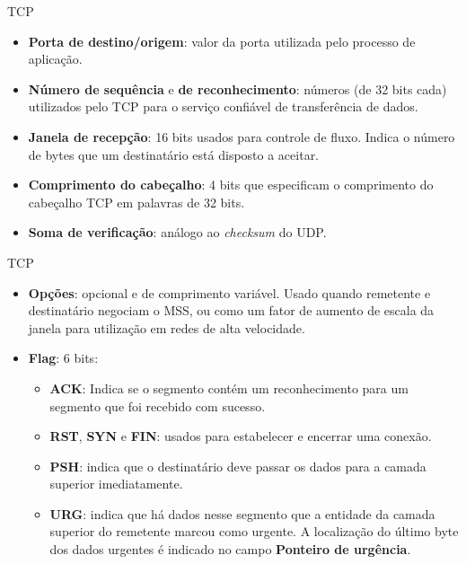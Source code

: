 \documentclass{libs/ufc_format}
\begin{document}
\begin{frame}{TCP}
    \begin{itemize}
        \justifying
        \item \textbf{Porta de destino/origem}: valor da porta utilizada pelo processo de aplicação.
        \item \textbf{Número de sequência} e \textbf{de reconhecimento}: números (de 32 bits cada) utilizados pelo TCP  para o serviço confiável de transferência de dados.
        \item \textbf{Janela de recepção}: 16 bits usados para controle de fluxo. Indica o número de bytes que um destinatário está disposto a aceitar.
        \item \textbf{Comprimento do cabeçalho}: 4 bits que especificam o comprimento do cabeçalho TCP em palavras de 32 bits.
        \item \textbf{Soma de verificação}: análogo ao \textit{checksum} do UDP.
    \end{itemize}
\end{frame}

\begin{frame}{TCP}
    \begin{itemize}
        \justifying
        \item \textbf{Opções}: opcional e de comprimento variável. Usado quando remetente e destinatário negociam o MSS, ou como um fator de aumento de escala da janela para utilização em redes de alta velocidade.
        \item \textbf{Flag}: 6 bits:
            \begin{itemize}
                \justifying
                \item \textbf{ACK}: Indica se o segmento contém um reconhecimento para um segmento que foi recebido com sucesso.
                \item \textbf{RST}, \textbf{SYN} e \textbf{FIN}: usados para estabelecer e encerrar uma conexão.
                \item \textbf{PSH}: indica que o destinatário deve passar os dados para a camada superior imediatamente.
                \item \textbf{URG}: indica que há dados nesse segmento que a entidade da camada superior do remetente marcou como urgente. A localização do último byte dos dados urgentes é indicado no campo \textbf{Ponteiro de urgência}.
            \end{itemize}
    \end{itemize}
\end{frame}
\end{document}

